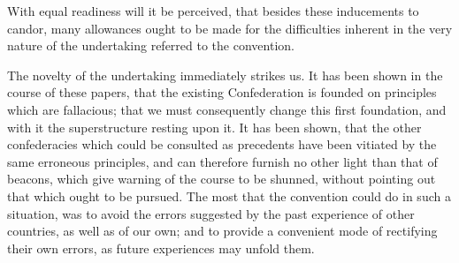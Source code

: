 With equal readiness will it be perceived, that besides these inducements to candor, many allowances ought to be made for the difficulties inherent in the very nature of the undertaking referred to the convention.

The novelty of the undertaking immediately strikes us. It has been shown in the course of these papers, that the existing Confederation is founded on principles which are fallacious; that we must consequently change this first foundation, and with it the superstructure resting upon it. It has been shown, that the other confederacies which could be consulted as precedents have been vitiated by the same erroneous principles, and can therefore furnish no other light than that of beacons, which give warning of the course to be shunned, without pointing out that which ought to be pursued. The most that the convention could do in such a situation, was to avoid the errors suggested by the past experience of other countries, as well as of our own; and to provide a convenient mode of rectifying their own errors, as future experiences may unfold them.

